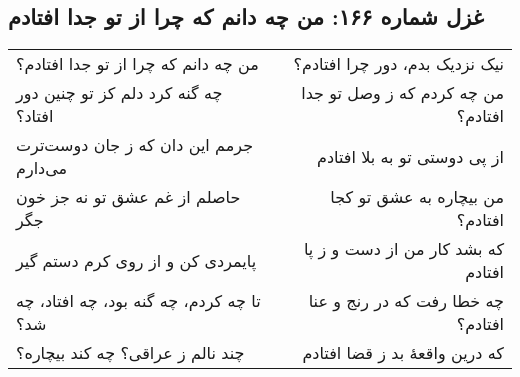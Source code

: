 \begin{center}
\section*{غزل شماره ۱۶۶: من چه دانم که چرا از تو جدا افتادم}
\label{sec:166}
\begin{longtable}{l p{0.5cm} r}
من چه دانم که چرا از تو جدا افتادم؟
&&
نیک نزدیک بدم، دور چرا افتادم؟
\\
چه گنه کرد دلم کز تو چنین دور افتاد؟
&&
من چه کردم که ز وصل تو جدا افتادم؟
\\
جرمم این دان که ز جان دوست‌ترت می‌دارم
&&
از پی دوستی تو به بلا افتادم
\\
حاصلم از غم عشق تو نه جز خون جگر
&&
من بیچاره به عشق تو کجا افتادم؟
\\
پایمردی کن و از روی کرم دستم گیر
&&
که بشد کار من از دست و ز پا افتادم
\\
تا چه کردم، چه گنه بود، چه افتاد، چه شد؟
&&
چه خطا رفت که در رنج و عنا افتادم؟
\\
چند نالم ز عراقی؟ چه کند بیچاره؟
&&
که درین واقعهٔ بد ز قضا افتادم
\\
\end{longtable}
\end{center}
